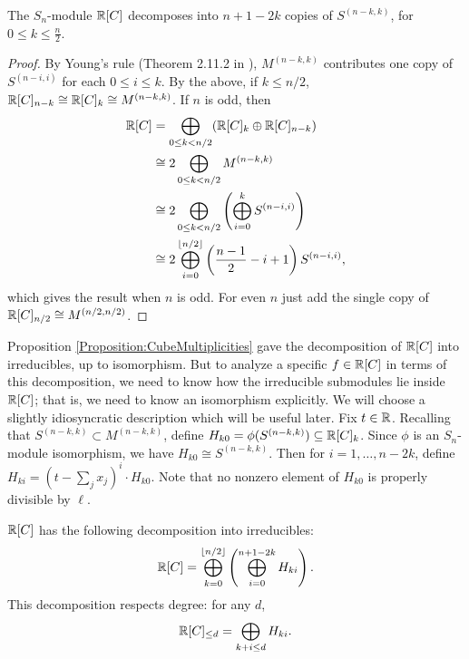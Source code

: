 \begin{proposition} \label{Proposition:CubeMultiplicities}
The $S_n$-module $\mathbb{R}[C]$ decomposes into $n+1-2k$ copies of $S^{(n-k,k)}$, for $0 \le k \le \frac{n}{2}$.
\end{proposition}
\begin{proof}
By Young's rule (Theorem 2.11.2 in \cite{Sagan}), $M^{(n-k,k)}$ contributes one copy of $S^{(n-i,i)}$ for each $0 \le i \le k$. By the above, if $k \le n/2$, $\mathbb{R}[C]_{n-k} \cong \mathbb{R}[C]_k \cong M^{(n-k,k)}$. 
If $n$ is odd, then 
\begin{align*}
\mathbb{R}[C] &= \bigoplus_{0 \le k < n/2} (\mathbb{R}[C]_k \oplus \mathbb{R}[C]_{n-k} ) \\
&\cong 2 \bigoplus_{0 \le k < n/2}  M^{(n-k,k)} \\
&\cong 2 \bigoplus_{0 \le k < n/2}  \left ( \bigoplus_{i=0}^k S^{(n-i,i)} \right ) \\
&\cong 2  \bigoplus_{i=0}^{\lfloor n/2 \rfloor} \left(\frac{n-1}{2} -i +1 \right) S^{(n-i,i)},
\end{align*}
which gives the result when $n$ is odd. For even $n$ just add the single copy of $\mathbb{R}[C]_{n/2} \cong M^{(n/2,n/2)}$.
\end{proof}

Proposition \ref{Proposition:CubeMultiplicities} gave the decomposition of $\mathbb{R}[C]$ into irreducibles, up to isomorphism. But to analyze a specific $f \in \mathbb{R}[C]$ in terms of this decomposition, we need to know how the irreducible submodules lie inside $\mathbb{R}[C]$; that is, we need to know an isomorphism explicitly. We will choose a slightly idiosyncratic description which will be useful later. Fix $t \in \mathbb{R}$. Recalling that $S^{(n-k,k)} \subset M^{(n-k,k)}$, define $H_{k0} = \phi(S^{(n-k,k)}) \subseteq \mathbb{R}[C]_k$. Since $\phi$ is an $S_n$-module isomorphism, we have $H_{k0} \cong S^{(n-k,k)}$. Then for $i = 1, \ldots, n-2k$, define $H_{ki} = (t-\sum_j x_j)^i \cdot H_{k0}$. Note that no nonzero element of $H_{k0}$ is properly divisible by $\ell$.

\begin{theorem} \label{Theorem:CubeDecomposition}
$\mathbb{R}[C]$ has the following decomposition into irreducibles:
$$\mathbb{R}[C] = \bigoplus_{k=0}^{\lfloor n/2 \rfloor} \left( \bigoplus_{i=0}^{n+1-2k}H_{ki}\right).$$ This decomposition respects degree: for any $d$,
$$\mathbb{R}[C]_{\le d} = \bigoplus_{k+i \le d} H_{ki}.$$
\end{theorem}


